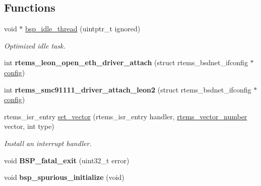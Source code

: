 \subsection*{Functions}
\begin{DoxyCompactItemize}
\item 
void $\ast$ \mbox{\hyperlink{group__RTEMSBSPsSPARCLEON2_ga301be7085b80c41a9c5887247003c662}{bsp\+\_\+idle\+\_\+thread}} (uintptr\+\_\+t ignored)
\begin{DoxyCompactList}\small\item\em Optimized idle task. \end{DoxyCompactList}\item 
\mbox{\label{group__RTEMSBSPsSPARCLEON2_ga5644148642cccc963f09e0a34d1d6d28}} 
int {\bfseries rtems\+\_\+leon\+\_\+open\+\_\+eth\+\_\+driver\+\_\+attach} (struct rtems\+\_\+bsdnet\+\_\+ifconfig $\ast$\mbox{\hyperlink{structconfig__s}{config}})
\item 
\mbox{\label{group__RTEMSBSPsSPARCLEON2_ga5a8bc8343a1c221baf0885d9875a84f4}} 
int {\bfseries rtems\+\_\+smc91111\+\_\+driver\+\_\+attach\+\_\+leon2} (struct rtems\+\_\+bsdnet\+\_\+ifconfig $\ast$\mbox{\hyperlink{structconfig__s}{config}})
\item 
rtems\+\_\+isr\+\_\+entry \mbox{\hyperlink{group__RTEMSBSPsSPARCLEON2_gab3388042c56b34c40be81fd5f028d97e}{set\+\_\+vector}} (rtems\+\_\+isr\+\_\+entry handler, \mbox{\hyperlink{group__ClassicINTR_ga3e434c197d99f128e78cae4d9358bd8b}{rtems\+\_\+vector\+\_\+number}} vector, int type)
\begin{DoxyCompactList}\small\item\em Install an interrupt handler. \end{DoxyCompactList}\item 
\mbox{\label{group__RTEMSBSPsSPARCLEON2_ga9806dc4ebe8d5e4501ace29eb97a8c84}} 
void {\bfseries B\+S\+P\+\_\+fatal\+\_\+exit} (uint32\+\_\+t error)
\item 
\mbox{\label{group__RTEMSBSPsSPARCLEON2_gab8c95f338c439b2257bb0f4dc3bc53ae}} 
void {\bfseries bsp\+\_\+spurious\+\_\+initialize} (void)
\item 
\mbox{\label{group__RTEMSBSPsSPARCLEON2_ga6069e1c3859da4080ac440883211b2b5}} 

\end{DoxyCompactItemize}
